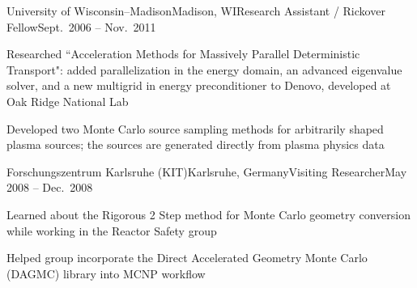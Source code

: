\begin{rSubsection}{University of Wisconsin--Madison}{Madison, WI}{Research Assistant / Rickover Fellow}{Sept.\ 2006 -- Nov.\ 2011}
\item Researched ``Acceleration Methods for Massively Parallel Deterministic Transport": added parallelization in the energy domain, an advanced eigenvalue solver, and a new multigrid in energy preconditioner to Denovo, developed at Oak Ridge National Lab
\item Developed two Monte Carlo source sampling methods for arbitrarily shaped plasma sources; the sources are generated directly from plasma physics data
\end{rSubsection}




\begin{rSubsection}{Forschungszentrum Karlsruhe (KIT)}{Karlsruhe, Germany}{Visiting Researcher}{May 2008 -- Dec.\ 2008}
\item Learned about the Rigorous 2 Step method for Monte Carlo geometry conversion while working in the Reactor Safety group
\item Helped group incorporate the Direct Accelerated Geometry Monte Carlo (DAGMC) library into MCNP workflow
\end{rSubsection}


